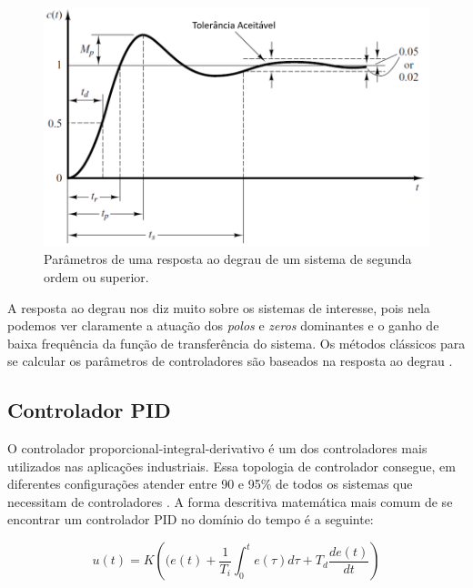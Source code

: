 \begin{figure}[H]
  \caption{Parâmetros de uma resposta ao degrau de um sistema de segunda ordem ou superior.}
  \begin{center}
      \includegraphics[scale=0.5]{referencial/img/transient_ogata_p170}
  \end{center}
  \label{fig:transient_ogata_p170}
\end{figure}

A resposta ao degrau nos diz muito sobre os sistemas de interesse, pois nela podemos ver claramente a atuação dos \textit{polos} e \textit{zeros} dominantes e o ganho de baixa frequência da função de transferência do sistema. Os métodos clássicos para se calcular os parâmetros de controladores são baseados na resposta ao degrau \cite{Ogata}. 



\subsection{Controlador PID}

O controlador proporcional-integral-derivativo é um dos controladores mais utilizados nas aplicações industriais. Essa topologia de controlador consegue, em diferentes configurações atender entre 90 e 95\% de todos os sistemas que necessitam de controladores \cite{Levine1996}. A forma descritiva matemática mais comum de se encontrar um controlador PID no domínio do tempo é a seguinte:

\begin{equation}\label{eq:PID}
  u(t) = K\left((e(t)+\frac{1}{T_i}\int_{0}^{t}{e(\tau)}d\tau+T_d\frac{de(t)}{dt}\right) 
\end{equation}

